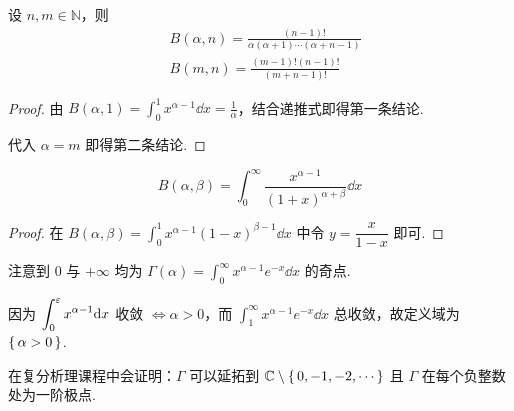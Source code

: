 \begin{inference}
    设 $n,m\in\mathbb{N}$，则
$$
\begin{aligned}
    &B(\alpha,n)=\frac{(n-1)!}{\alpha(\alpha+1)\cdots(\alpha+n-1)}\\
    &B(m,n)=\frac{(m-1)!(n-1)!}{(m+n-1)!}
\end{aligned}
$$
\end{inference}
\begin{proof}
    由 $B(\alpha,1)=\displaystyle\int_0^1x^{\alpha-1}\dd x=\frac{1}{\alpha}$，结合递推式即得第一条结论.

    代入 $\alpha=m$ 即得第二条结论.
\end{proof}


\begin{property}
$$
B(\alpha,\beta)=\int_0^\infty\frac{x^{\alpha-1}}{(1+x)^{\alpha+\beta}}\dd x
$$
\end{property}
\begin{proof}
    在 $B(\alpha,\beta)=\displaystyle\int_0^1x^{\alpha-1}(1-x)^{\beta-1}\dd x$ 中令 $y=\dfrac{x}{1-x}$ 即可.
\end{proof}



注意到 $0$ 与 $+\infty$ 均为 $\Gamma(\alpha)=\displaystyle\int_0^\infty x^{\alpha-1}e^{-x}\dd x$ 的奇点.

因为 $\displaystyle\int_0^\varepsilon x^{\alpha-1}\mathrm{d} x$ 收敛 $\iff\alpha>0$，而 $\int_1^\infty x^{\alpha-1}e^{-x}\dd x$ 总收敛，故定义域为 $\set{\alpha>0}$.

\begin{hint}
    在复分析理课程中会证明：$\Gamma$ 可以延拓到 $\mathbb{C}\setminus\set{0,-1,-2,\cdots}$ 且 $\Gamma$ 在每个负整数处为一阶极点.
\end{hint}


